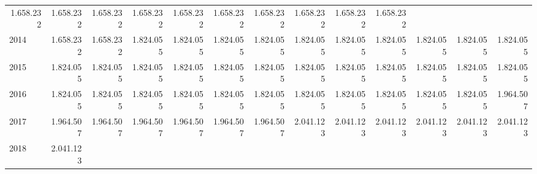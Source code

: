 \begin{tabular}{lllllllllllll}
  \multicolumn{1}{r}{1.658.232} &
  \multicolumn{1}{r}{1.658.232} &
  \multicolumn{1}{r}{1.658.232} &
  \multicolumn{1}{r}{1.658.232} &
  \multicolumn{1}{r}{1.658.232} &
  \multicolumn{1}{r}{1.658.232} &
  \multicolumn{1}{r}{1.658.232} &
  \multicolumn{1}{r}{1.658.232} &
  \multicolumn{1}{r}{1.658.232} &
  \multicolumn{1}{r}{1.658.232} \\
\multicolumn{1}{l}{\hspace{1em}2014} &
  \multicolumn{1}{|r}{1.658.232} &
  \multicolumn{1}{r}{1.658.232} &
  \multicolumn{1}{r}{1.824.055} &
  \multicolumn{1}{r}{1.824.055} &
  \multicolumn{1}{r}{1.824.055} &
  \multicolumn{1}{r}{1.824.055} &
  \multicolumn{1}{r}{1.824.055} &
  \multicolumn{1}{r}{1.824.055} &
  \multicolumn{1}{r}{1.824.055} &
  \multicolumn{1}{r}{1.824.055} &
  \multicolumn{1}{r}{1.824.055} &
  \multicolumn{1}{r}{1.824.055} \\
\multicolumn{1}{l}{\hspace{1em}2015} &
  \multicolumn{1}{|r}{1.824.055} &
  \multicolumn{1}{r}{1.824.055} &
  \multicolumn{1}{r}{1.824.055} &
  \multicolumn{1}{r}{1.824.055} &
  \multicolumn{1}{r}{1.824.055} &
  \multicolumn{1}{r}{1.824.055} &
  \multicolumn{1}{r}{1.824.055} &
  \multicolumn{1}{r}{1.824.055} &
  \multicolumn{1}{r}{1.824.055} &
  \multicolumn{1}{r}{1.824.055} &
  \multicolumn{1}{r}{1.824.055} &
  \multicolumn{1}{r}{1.824.055} \\
\multicolumn{1}{l}{\hspace{1em}2016} &
  \multicolumn{1}{|r}{1.824.055} &
  \multicolumn{1}{r}{1.824.055} &
  \multicolumn{1}{r}{1.824.055} &
  \multicolumn{1}{r}{1.824.055} &
  \multicolumn{1}{r}{1.824.055} &
  \multicolumn{1}{r}{1.824.055} &
  \multicolumn{1}{r}{1.824.055} &
  \multicolumn{1}{r}{1.824.055} &
  \multicolumn{1}{r}{1.824.055} &
  \multicolumn{1}{r}{1.824.055} &
  \multicolumn{1}{r}{1.824.055} &
  \multicolumn{1}{r}{1.964.507} \\
\multicolumn{1}{l}{\hspace{1em}2017} &
  \multicolumn{1}{|r}{1.964.507} &
  \multicolumn{1}{r}{1.964.507} &
  \multicolumn{1}{r}{1.964.507} &
  \multicolumn{1}{r}{1.964.507} &
  \multicolumn{1}{r}{1.964.507} &
  \multicolumn{1}{r}{1.964.507} &
  \multicolumn{1}{r}{2.041.123} &
  \multicolumn{1}{r}{2.041.123} &
  \multicolumn{1}{r}{2.041.123} &
  \multicolumn{1}{r}{2.041.123} &
  \multicolumn{1}{r}{2.041.123} &
  \multicolumn{1}{r}{2.041.123} \\
\multicolumn{1}{l}{\hspace{1em}2018} &
  \multicolumn{1}{|r}{2.041.123} &

\end{tabular}
